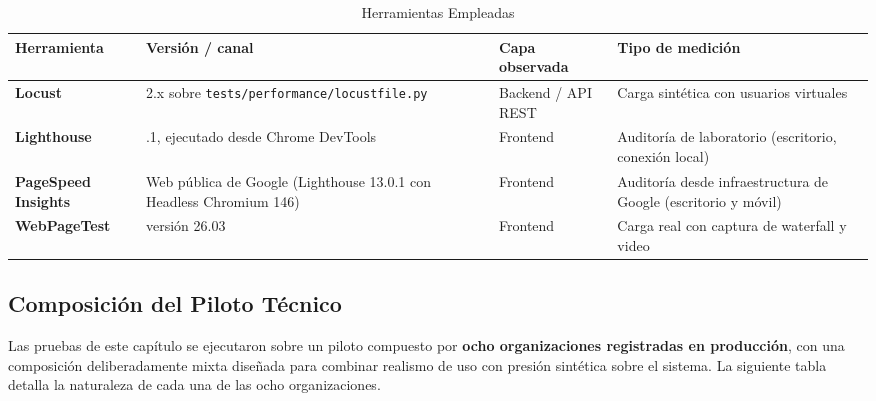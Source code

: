\begin{longtable}[]{@{}
  >{\raggedright\arraybackslash}p{}
  >{\raggedright\arraybackslash}p{}
  >{\raggedright\arraybackslash}p{}
  >{\raggedright\arraybackslash}p{}@{}}
\caption[Herramientas Empleadas]{Herramientas Empleadas}\tabularnewline
\toprule\noalign{}
\begin{minipage}[b]{\linewidth}\raggedright
Herramienta
\end{minipage} & \begin{minipage}[b]{\linewidth}\raggedright
Versión / canal
\end{minipage} & \begin{minipage}[b]{\linewidth}\raggedright
Capa observada
\end{minipage} & \begin{minipage}[b]{\linewidth}\raggedright
Tipo de medición
\end{minipage} \\
\midrule\noalign{}
\endhead
\bottomrule\noalign{}
\endlastfoot
\textbf{Locust} & 2.x sobre \texttt{tests/performance/locustfile.py} & Backend / API REST & Carga sintética con usuarios virtuales \\
\textbf{Lighthouse} & 13.0.1, ejecutado desde Chrome DevTools & Frontend & Auditoría de laboratorio (escritorio, conexión local) \\
\textbf{PageSpeed Insights} & Web pública de Google (Lighthouse 13.0.1 con Headless Chromium 146) & Frontend & Auditoría desde infraestructura de Google (escritorio y móvil) \\
\textbf{WebPageTest} & versión 26.03 & Frontend & Carga real con captura de waterfall y video \\
\end{longtable}

\subsection{Composición del Piloto Técnico}\label{composiciuxf3n-del-piloto-tuxe9cnico}

Las pruebas de este capítulo se ejecutaron sobre un piloto compuesto por \textbf{ocho organizaciones registradas en producción}, con una composición deliberadamente mixta diseñada para combinar realismo de uso con presión sintética sobre el sistema. La siguiente tabla detalla la naturaleza de cada una de las ocho organizaciones.


